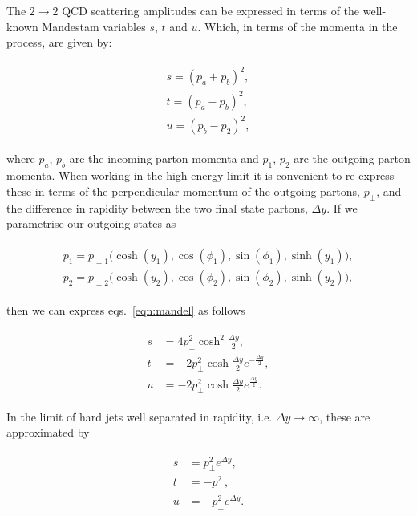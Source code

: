 		The $2\rightarrow 2$ QCD scattering amplitudes can be expressed in terms of the well-known Mandestam
		variables $s$, $t$ and $u$.  Which, in terms of the momenta in the process, are given by:

		\begin{align}
		\begin{split}
			s = (p_a + p_b)^2, \\
			t = (p_a - p_b)^2, \\
			u = (p_b - p_2)^2,
			\label{eqn:mandel}
		\end{split}
		\end{align}

		where $p_a$, $p_b$ are the incoming parton momenta and $p_1$, $p_2$ are the outgoing parton momenta.
		When working in the high energy limit it is convenient to re-express these in terms of the
		perpendicular momentum of the outgoing partons, $p_\perp$, and the difference in rapidity
		between the two final state partons, $\Delta y$.  If we parametrise our outgoing states as

		\begin{align}
		\begin{split}
			p_1 = p_{\perp1}\big(\cosh (y_1), \cos(\phi_1), \sin(\phi_1), \sinh (y_1)\big),\\
			p_2 = p_{\perp2}\big(\cosh (y_2), \cos(\phi_2), \sin(\phi_2), \sinh (y_2)\big),
		\end{split}
		\end{align}

		then we can express eqs.~\eqref{eqn:mandel} as follows

		\begin{align}
		\begin{split}
			s &=  4p_\perp^2 \cosh^2\frac{\Delta y}{2}, \\
			t &= -2p_\perp^2 \cosh  \frac{\Delta y}{2}e^{-\frac{\Delta y}{2}}, \\
			u &= -2p_\perp^2 \cosh  \frac{\Delta y}{2}e^{ \frac{\Delta y}{2}}.
		\end{split}
		\end{align}

		In the limit of hard jets well separated in rapidity, i.e. $\Delta y\rightarrow\infty$,
		these are approximated by

		\begin{align}
		\begin{split}
			s &= p_\perp^2 e^{\Delta y},\\
			t &= -p_\perp^2,\\
			u &= -p_\perp^2 e^{\Delta y}.
			\label{eqn:mandel2}
		\end{split}
		\end{align}

